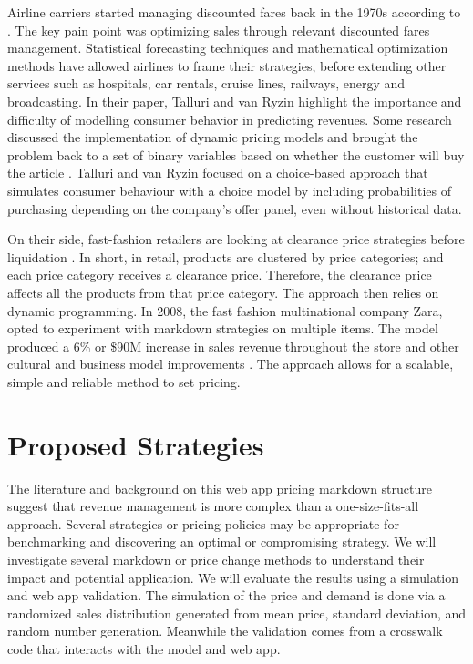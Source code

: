 \documentclass[11pt,a4paper]{article}
\begin{document}
Airline carriers started managing discounted fares back in the 1970s according to \linebreak 
\cite{talluri2004revenue}. 
The key pain point was optimizing sales through relevant discounted fares management. 
Statistical forecasting techniques and mathematical optimization methods have allowed airlines to frame their strategies, before extending other services such as hospitals, car rentals, cruise lines, railways, energy and broadcasting. 
In their paper, Talluri and van Ryzin highlight the importance and difficulty of modelling consumer behavior in predicting revenues. 
Some research discussed the implementation of dynamic pricing models and brought the problem back to a set of binary variables based on whether the customer will buy the article \cite{bitran1998structured,feng2000perishable,gallego1994optimal}. 
Talluri and van Ryzin focused on a choice-based approach that simulates consumer behaviour with a choice model by including probabilities of purchasing depending on the company’s offer panel, even without historical data.

On their side, fast-fashion retailers are looking at clearance price strategies before liquidation \cite{caro2012clearance}. 
In short, in retail, products are clustered by price categories; and each price category receives a clearance price. 
Therefore, the clearance price affects all the products from that price category. 
The approach then relies on dynamic programming. 
In 2008, the fast fashion multinational company Zara, opted to experiment with markdown strategies on multiple items. 
The model produced a 6\% or \$90M increase in sales revenue throughout the store and other cultural and business model improvements \cite{caro2012clearance}. 
The approach allows for a scalable, simple and reliable method to set pricing. 

\section{Proposed Strategies}
The literature and background on this web app pricing markdown structure suggest that revenue management is more complex than a one-size-fits-all approach. 
Several strategies or pricing policies may be appropriate for benchmarking and discovering an optimal or compromising strategy.
We will investigate several markdown or price change methods to understand their impact and potential application. 
We will evaluate the results using a simulation and web app validation. 
The simulation of the price and demand is done via a randomized sales distribution generated from mean price, standard deviation, and random number generation. 
Meanwhile the validation comes from a crosswalk code that interacts with the model and web app.
\end{document}
